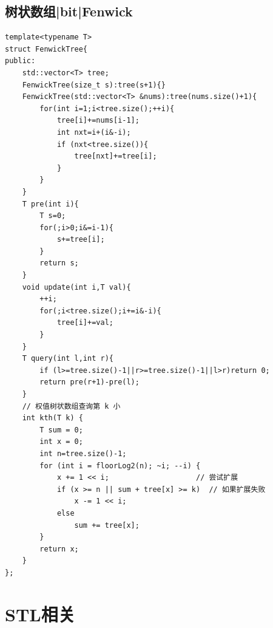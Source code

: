 \documentclass[UTF8,twoside]{ctexart}
\begin{document}
\subsection{树状数组|bit|Fenwick}
\begin{lstlisting}
template<typename T>
struct FenwickTree{
public:
    std::vector<T> tree;
    FenwickTree(size_t s):tree(s+1){}
    FenwickTree(std::vector<T> &nums):tree(nums.size()+1){
        for(int i=1;i<tree.size();++i){
            tree[i]+=nums[i-1];
            int nxt=i+(i&-i);
            if (nxt<tree.size()){
                tree[nxt]+=tree[i];
            }
        }
    }
    T pre(int i){
        T s=0;
        for(;i>0;i&=i-1){
            s+=tree[i];
        }
        return s;
    }
    void update(int i,T val){
        ++i;
        for(;i<tree.size();i+=i&-i){
            tree[i]+=val;
        }
    }
    T query(int l,int r){
        if (l>=tree.size()-1||r>=tree.size()-1||l>r)return 0;
        return pre(r+1)-pre(l);
    }
    // 权值树状数组查询第 k 小
    int kth(T k) {
        T sum = 0;
        int x = 0;
        int n=tree.size()-1;
        for (int i = floorLog2(n); ~i; --i) {
            x += 1 << i;                    // 尝试扩展
            if (x >= n || sum + tree[x] >= k)  // 如果扩展失败
                x -= 1 << i;
            else
                sum += tree[x];
        }
        return x;
    }
};
\end{lstlisting}
\section{STL相关}
\end{document}
